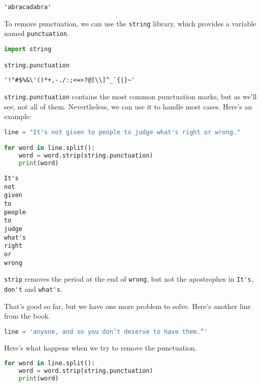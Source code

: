 \begin{lstlisting}[style=output]
'abracadabra'
\end{lstlisting}

To remove punctuation, we can use the \passthrough{\lstinline!string!}
library, which provides a variable named
\passthrough{\lstinline!punctuation!}.

\begin{lstlisting}[language=Python,style=source]
import string

string.punctuation
\end{lstlisting}

\begin{lstlisting}[style=output]
'!"#$%&\'()*+,-./:;<=>?@[\\]^_`{|}~'
\end{lstlisting}

\passthrough{\lstinline!string.punctuation!} contains the most common
punctuation marks, but as we'll see, not all of them. Nevertheless, we
can use it to handle most cases. Here's an example:

\begin{lstlisting}[language=Python,style=source]
line = "It's not given to people to judge what's right or wrong."

for word in line.split():
    word = word.strip(string.punctuation)
    print(word)
\end{lstlisting}

\begin{lstlisting}[style=output]
It's
not
given
to
people
to
judge
what's
right
or
wrong
\end{lstlisting}

\passthrough{\lstinline!strip!} removes the period at the end of
\passthrough{\lstinline!wrong!}, but not the apostrophes in
\passthrough{\lstinline!It's!}, \passthrough{\lstinline!don't!} and
\passthrough{\lstinline!what's!}.

That's good so far, but we have one more problem to solve. Here's
another line from the book.

\begin{lstlisting}[language=Python,style=source]
line = 'anyone, and so you don’t deserve to have them.”'
\end{lstlisting}

Here's what happens when we try to remove the punctuation.

\begin{lstlisting}[language=Python,style=source]
for word in line.split():
    word = word.strip(string.punctuation)
    print(word)
\end{lstlisting}

